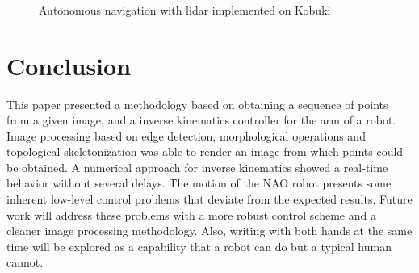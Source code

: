 \documentclass[conference]{IEEEtran}
\begin{document}
\begin{figure}
	\centering
	\\
	\\
	\\
	\caption{Autonomous navigation with lidar implemented on Kobuki} \label{f:kbki_lidar}
\end{figure}

\section{Conclusion}
\label{sec:conclusion}
This paper presented a methodology based on obtaining a sequence of points from a given image, and a inverse kinematics controller for the arm of a robot. Image processing based on edge detection, morphological operations and topological skeletonization was able to render an image from which points could be obtained. A numerical approach for inverse kinematics showed a real-time behavior without several delays. The motion of the NAO robot presents some inherent low-level control problems that deviate from the expected results. Future work will address these problems with a more robust control scheme and a cleaner image processing methodology. Also, writing with both hands at the same time will be explored as a capability that a robot can do but a typical human cannot.



\end{document}
